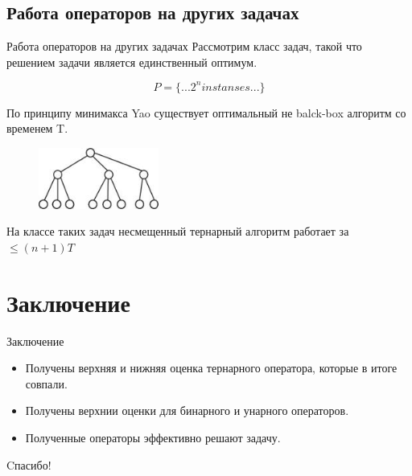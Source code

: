 \documentclass{beamer}
\begin{document}
 
\subsection{Работа операторов на других задачах}
 \begin{frame}{Работа операторов на других задачах}
    Рассмотрим класс задач, такой что решением задачи является единственный оптимум. 
    
    $$ P = \{...2^n instanses...\}  $$
    
    По принципу минимакса Yao существует оптимальный не balck-box алгоритм со временем T. 
 
 
    \begin{figure}[h]
    \includegraphics[height=2cm]{image017.jpg}
    \end{figure}   
    
    На классе таких задач несмещенный тернарный алгоритм работает за $\le (n+1)T$
    
    
 \end{frame}


\section{Заключение}

\begin{frame}{Заключение}
  \begin{itemize}
  \item
    Получены верхняя и нижняя оценка тернарного оператора, которые в итоге совпали.
  \item
    Получены верхнии оценки для бинарного и унарного операторов.
  \item
    Полученные операторы эффективно решают задачу.
  \end{itemize}
\end{frame}

 \begin{frame}
    \center Cпасибо!
 \end{frame}
 
 
\end{document}
